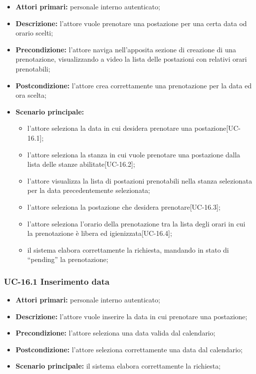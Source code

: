 \begin{itemize}
\item \textbf{Attori primari:} personale interno autenticato;
\item \textbf{Descrizione:} l'attore vuole prenotare una postazione per una certa data od orario scelti;
\item \textbf{Precondizione:} l'attore naviga nell’apposita sezione di creazione di una prenotazione, visualizzando a video la lista delle postazioni con relativi orari prenotabili;
\item \textbf{Postcondizione:} l'attore crea correttamente una prenotazione per la data ed ora scelta;
\item \textbf{Scenario principale:} 
	\begin{itemize}
		\item l'attore seleziona la data in cui desidera prenotare una postazione[UC-16.1];
		\item l'attore seleziona la stanza in cui vuole prenotare una postazione dalla lista delle stanze abilitate[UC-16.2];
		\item l'attore visualizza la lista di postazioni prenotabili nella stanza selezionata per la data precedentemente selezionata;
		\item l'attore seleziona la postazione che desidera prenotare[UC-16.3];
		\item l'attore seleziona l'orario della prenotazione tra la lista degli orari in cui la prenotazione è libera ed igienizzata[UC-16.4];
		\item il sistema elabora correttamente la richiesta, mandando in stato di “pending” la prenotazione;
	\end{itemize}
\end{itemize}

\subsubsection{UC-16.1 Inserimento data}

\begin{itemize}
\item \textbf{Attori primari:} personale interno autenticato;
\item \textbf{Descrizione:} l'attore vuole inserire la data in cui prenotare una postazione;
\item \textbf{Precondizione:} l'attore seleziona una data valida dal calendario;
\item \textbf{Postcondizione:} l'attore seleziona correttamente una data dal calendario;
\item \textbf{Scenario principale:} il sistema elabora correttamente la richiesta;
\end{itemize}

